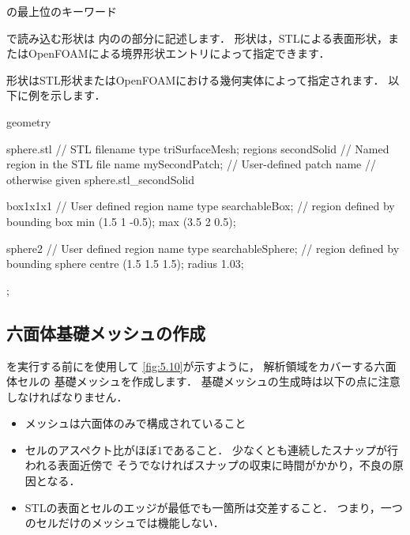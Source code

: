 \begin{table}[ht]
 
 \caption{の最上位のキーワード}
 \label{tbl:5.7}
\end{table}


で読み込む形状は
内のの部分に記述します．
形状は，STLによる表面形状，またはOpenFOAMによる境界形状エントリによって指定できます．

形状はSTL形状またはOpenFOAMにおける幾何実体によって指定されます．
以下に例を示します．
\begin{OFverbatim}[file]
geometry
  {
      sphere.stl // STL filename
      {
          type triSurfaceMesh;
          regions
          {
              secondSolid             // Named region in the STL file
              {
                  name mySecondPatch; // User-defined patch name
              }                       // otherwise given sphere.stl_secondSolid
          }
      }

      box1x1x1  // User defined region name
      {
          type   searchableBox;       // region defined by bounding box
          min    (1.5 1 -0.5);
          max    (3.5 2 0.5);
      }

      sphere2  // User defined region name
      {
          type   searchableSphere;    // region defined by bounding sphere
          centre (1.5 1.5 1.5);
          radius 1.03;
      }
  };
\end{OFverbatim}


\subsection{六面体基礎メッシュの作成}
\label{ssec:5.4.2}
を実行する前にを使用して
\autoref{fig:5.10}が示すように，
解析領域をカバーする六面体セルの
%
基礎メッシュを作成します．
基礎メッシュの生成時は以下の点に注意しなければなりません．
\begin{itemize}
 \item メッシュは六面体のみで構成されていること
 \item セルのアスペクト比がほぼ$1$であること．
       少なくとも連続したスナップが行われる表面近傍で
       そうでなければスナップの収束に時間がかかり，不良の原因となる．
 \item STLの表面とセルのエッジが最低でも一箇所は交差すること．
       つまり，一つのセルだけのメッシュでは機能しない．
\end{itemize}


